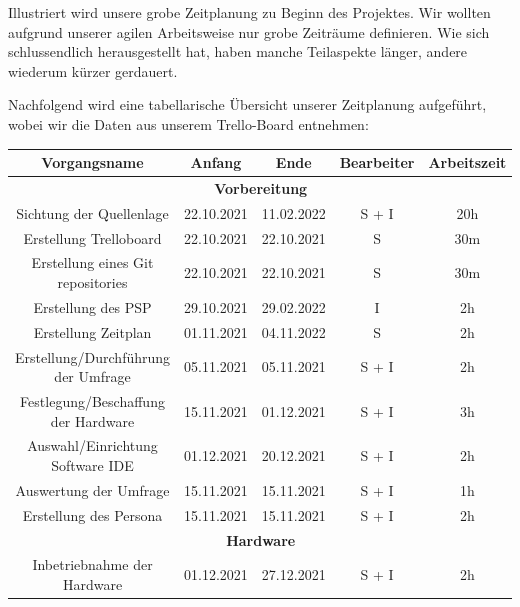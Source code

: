 Illustriert wird unsere grobe Zeitplanung zu Beginn des Projektes. Wir wollten aufgrund unserer agilen Arbeitsweise nur grobe Zeiträume definieren. Wie sich schlussendlich herausgestellt hat, haben manche Teilaspekte länger, andere wiederum kürzer gerdauert.\\



\newpage

Nachfolgend wird eine tabellarische Übersicht unserer Zeitplanung aufgeführt, wobei wir die Daten aus unserem Trello-Board entnehmen:\\

\begin{adjustwidth}{-1in}{-1in}%
	\begin{center}
		\begin{tabular}{ ccccc }
			\toprule
			{Vorgangsname} & {Anfang} & {Ende} & {Bearbeiter} & {Arbeitszeit}\\

			\midrule
			\multicolumn{5}{c}{\textbf{Vorbereitung}} \\
			{Sichtung der Quellenlage} & {22.10.2021} & {11.02.2022} & S + I & 20h\\
			{Erstellung Trelloboard} & {22.10.2021} & {22.10.2021} & S & 30m\\
			{Erstellung eines Git repositories} & {22.10.2021} & {22.10.2021} & S & 30m\\
			{Erstellung des PSP} & {29.10.2021} & {29.02.2022} & I & 2h\\
			{Erstellung Zeitplan} & {01.11.2021} & {04.11.2022} & S & 2h\\
			{Erstellung/Durchführung der Umfrage} & {05.11.2021} & {05.11.2021} & S + I & 2h\\
			{Festlegung/Beschaffung der Hardware} & {15.11.2021} & {01.12.2021} & S + I & 3h\\
			{Auswahl/Einrichtung Software IDE} & {01.12.2021} & {20.12.2021} & S + I & 2h\\
			{Auswertung der Umfrage} & {15.11.2021} & {15.11.2021} & S + I & 1h\\
			{Erstellung des Persona} & {15.11.2021} & {15.11.2021} & S + I & 2h\\

			\midrule
			\multicolumn{5}{c}{\textbf{Hardware}} \\
			{Inbetriebnahme der Hardware} & {01.12.2021} & {27.12.2021} & S + I & 2h\\


\end{tabular}
\end{center}
\end{adjustwidth}
